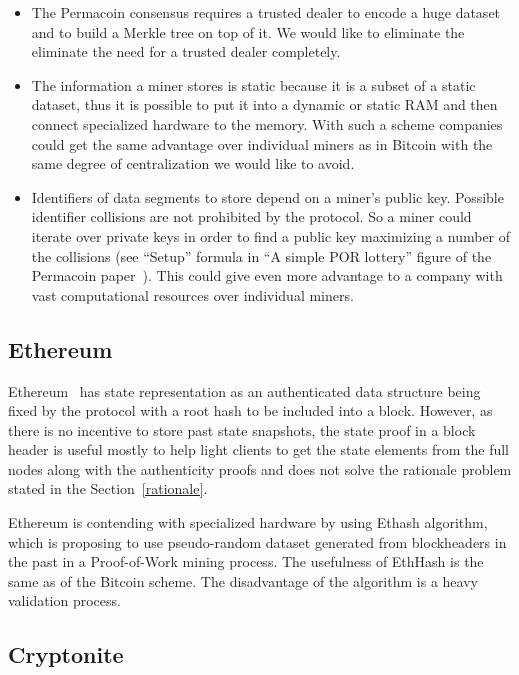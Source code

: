 \documentclass[conference,compsoc]{IEEEtran}
\begin{document}
\begin{itemize}

\item The Permacoin consensus requires a trusted dealer to encode a huge dataset and to build a Merkle tree on top of it. We would like to eliminate the eliminate the need for a trusted dealer completely.

\item The information a miner stores is static because it is a subset of a static dataset, thus it is possible to put it into a dynamic or static RAM and then connect specialized hardware to the memory. With such a scheme companies could get the same advantage over individual miners as in Bitcoin with the same degree of centralization we would like to avoid.

\item Identifiers of data segments to store depend on a miner's public key. Possible identifier collisions are not prohibited by the protocol. So a miner could iterate over private keys in order to find a public key maximizing a number of the collisions (see ``Setup'' formula in ``A simple POR lottery'' figure of the Permacoin paper~\cite{miller2014permacoin}). This could give even more advantage to a company with vast computational resources over individual miners.

\end{itemize}

\subsection{Ethereum}

Ethereum~\cite{ethyp} has state representation as an authenticated data structure being fixed by the protocol with a root hash to be included into a block. However, as there is no incentive to store past state snapshots, the state proof in a block header is useful mostly to help light clients to get the state elements from the full nodes along with the authenticity proofs and does not solve the rationale problem stated in the Section~\ref{rationale}.

Ethereum is contending with specialized hardware by using Ethash algorithm, which is proposing to use pseudo-random dataset generated from blockheaders in the past in a Proof-of-Work mining process. The usefulness of EthHash is the same as of the Bitcoin scheme. The disadvantage of the algorithm is a heavy validation process.


\subsection{Cryptonite}
\end{document}
